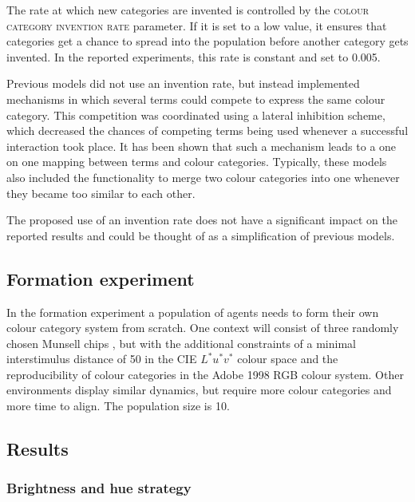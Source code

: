 \newpage
The rate at which new categories are invented is controlled by the
\textsc{colour category invention rate}
parameter. If it is set to a low value, it ensures that categories get
a chance to spread into the population before another category gets
invented. In the reported experiments, this rate is constant and set
to 0.005.

Previous models \citep{steels05coordinating, belpaeme05explaining,
  belpaeme07language} did not use an invention rate, but instead implemented
mechanisms in which several terms could compete to express the same
colour category. This competition was coordinated using a lateral
inhibition scheme, which decreased the chances of competing terms being used
whenever a successful interaction took place. It has been shown that
such a mechanism leads to a one on one mapping between terms and
colour categories. Typically, these models also included the
functionality to merge two colour categories into one whenever they
became too similar to each other. 

The proposed use of an invention rate does not have a significant
impact on the reported results and could be thought of as a
simplification of previous models.

\subsection{Formation experiment}
\label{s:formation-experiment}

In the formation experiment a population of agents needs to form
their own colour category system from scratch. One context will
consist of three randomly chosen Munsell chips \citep{newhall42final},
but with the additional constraints of a minimal
interstimulus distance of 50 in the CIE $L^*u^*v^*$ colour space and
the reproducibility of colour categories in the Adobe 1998 RGB
colour system. Other environments display similar dynamics, but
require more colour categories and more time to align. The population
size is 10.

\subsection{Results}

\subsubsection{Brightness and hue strategy}

